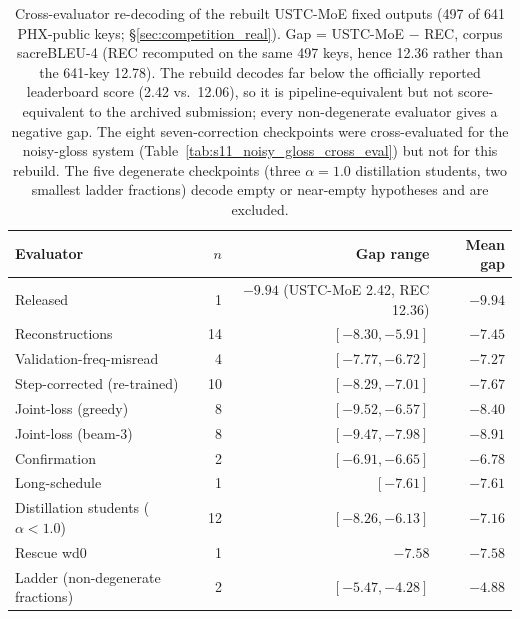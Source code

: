 \documentclass[pdflatex,sn-chicago]{sn-jnl}
\begin{document}
\begin{table}[h]
\centering
\scriptsize\setlength{\tabcolsep}{3pt}
\caption{Cross-evaluator re-decoding of the rebuilt USTC-MoE fixed outputs (497 of 641 PHX-public keys; \S\ref{sec:competition_real}). Gap = USTC-MoE $-$ REC, corpus sacreBLEU-4 (REC recomputed on the same 497 keys, hence 12.36 rather than the 641-key 12.78). The rebuild decodes far below the officially reported leaderboard score (2.42 vs.\ 12.06), so it is pipeline-equivalent but not score-equivalent to the archived submission; every non-degenerate evaluator gives a negative gap. The eight seven-correction checkpoints were cross-evaluated for the noisy-gloss system (Table~\ref{tab:s11_noisy_gloss_cross_eval}) but not for this rebuild. The five degenerate checkpoints (three $\alpha{=}1.0$ distillation students, two smallest ladder fractions) decode empty or near-empty hypotheses and are excluded.}
\label{tab:s12_ustc_moe_cross_eval}
\begin{tabular}{lrrr}
\toprule
Evaluator & $n$ & Gap range & Mean gap \\
\midrule
Released & 1 & $-9.94$ (USTC-MoE 2.42, REC 12.36) & $-9.94$ \\
Reconstructions & 14 & $[-8.30, -5.91]$ & $-7.45$ \\
Validation-freq-misread & 4 & $[-7.77, -6.72]$ & $-7.27$ \\
Step-corrected (re-trained) & 10 & $[-8.29, -7.01]$ & $-7.67$ \\
Joint-loss (greedy) & 8 & $[-9.52, -6.57]$ & $-8.40$ \\
Joint-loss (beam-3) & 8 & $[-9.47, -7.98]$ & $-8.91$ \\
Confirmation & 2 & $[-6.91, -6.65]$ & $-6.78$ \\
Long-schedule & 1 & $[-7.61]$ & $-7.61$ \\
Distillation students ($\alpha{<}1.0$) & 12 & $[-8.26, -6.13]$ & $-7.16$ \\
Rescue wd0 & 1 & $-7.58$ & $-7.58$ \\
Ladder (non-degenerate fractions) & 2 & $[-5.47, -4.28]$ & $-4.88$ \\
\bottomrule
\end{tabular}
\end{table}
\end{document}
